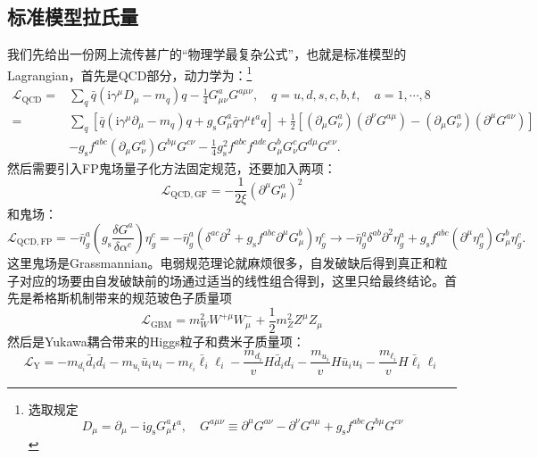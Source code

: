\subsection{标准模型拉氏量}
我们先给出一份网上流传甚广的“物理学最复杂公式”，也就是标准模型的Lagrangian，首先是QCD部分，动力学为：\footnote{选取规定\[D_\mu=\partial_\mu-\mathrm{i}g_\mathrm{s}G_\mu^at^a,\quad G^{a\mu\nu}\equiv\partial^\mu G^{a\nu}-\partial^\nu G^{a\mu}+g_\mathrm{s}f^{abc}G^{b\mu}G^{c\nu}\]}
\begin{equation}
	\begin{aligned}
		\mathcal{L}_\mathrm{QCD}=&\sum_q\bar{q}(\mathrm{i}\gamma^\mu D_\mu-m_q)q-\frac14G_{\mu\nu}^aG^{a\mu\nu},\quad q=u,d,s,c,b,t,\quad a=1,\cdots,8\\
		=&\sum_q[\bar{q}(\mathrm{i}\gamma^{\mu}\partial_{\mu}-m_{q})q+g_{\mathrm{s}}G_{\mu}^{a}\bar{q}\gamma^{\mu}t^{a}q]+\frac12[(\partial_{\mu}G_{\nu}^{a})(\partial^{\nu}G^{a\mu})-(\partial_{\mu}G_{\nu}^{a})(\partial^{\mu}G^{a\nu})]\\
		&-g_{\mathrm{s}}f^{abc}(\partial_{\mu}G_{\nu}^{a})G^{b\mu}G^{c\nu}-\frac{1}{4}g_{\mathrm{s}}^{2}f^{abc}f^{ade}G_{\mu}^{b}G_{\nu}^{c}G^{d\mu}G^{e\nu}.
	\end{aligned}
\end{equation}
然后需要引入FP鬼场量子化方法固定规范，还要加入两项：
\begin{equation}
	\mathcal{L}_{\mathrm{QCD,GF}}=-\frac1{2\xi}(\partial^{\mu}G_{\mu}^{a})^{2}
\end{equation}
和鬼场：
\begin{equation}
	\mathcal{L}_{\mathrm{QCD,FP}}=-\bar{\eta}_{g}^{a}\left(g_{\mathrm{s}}\frac{\delta G^{a}}{\delta\alpha^{c}}\right)\eta_{g}^{c}=-\bar{\eta}_{g}^{a}(\delta^{ac}\partial^{2}+g_{\mathrm{s}}f^{abc}\partial^{\mu}G_{\mu}^{b})\eta_{g}^{c}\rightarrow-\bar{\eta}_{g}^{a}\delta^{ab}\partial^{2}\eta_{g}^{a}+g_{\mathrm{s}}f^{abc}(\partial^{\mu}\eta_{g}^{a})G_{\mu}^{b}\eta_{g}^{c}.
\end{equation}
这里鬼场是Grassmannian。电弱规范理论就麻烦很多，自发破缺后得到真正和粒子对应的场要由自发破缺前的场通过适当的线性组合得到，这里只给最终结论。首先是希格斯机制带来的规范玻色子质量项
\begin{equation}
	\mathcal{L}_\mathrm{GBM}=m_W^2W^{+\mu}W_\mu^-+\frac12m_Z^2Z^\mu Z_\mu 
\end{equation}
然后是Yukawa耦合带来的Higgs粒子和费米子质量项：
\begin{equation}\label{eq:5.6}
	\mathcal{L}_{\mathrm{Y}}=-m_{d_i}\bar{d}_id_i-m_{u_i}\bar{u}_iu_i-m_{\ell_i}\bar{\ell}_i\ell_i-\frac{m_{d_i}}vH\bar{d}_id_i-\frac{m_{u_i}}vH\bar{u}_iu_i-\frac{m_{\ell_i}}vH\bar{\ell}_i\ell_i
\end{equation}
